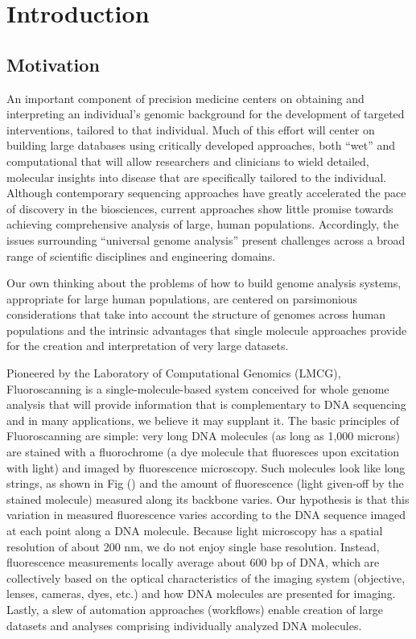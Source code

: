 \section{Introduction}

\subsection{Motivation}
An important component of precision medicine centers on obtaining and interpreting an individual's genomic background for the development of targeted interventions, tailored to that individual. Much of this effort will center on building large databases using critically developed approaches, both ``wet'' and computational that will allow researchers and clinicians to wield detailed, molecular insights into disease that are specifically tailored to the individual. Although contemporary sequencing approaches have greatly accelerated the pace of discovery in the biosciences, current approaches show little promise towards achieving comprehensive analysis of large, human populations. Accordingly, the issues surrounding ``universal genome analysis'' present challenges across a broad range of scientific disciplines and engineering domains.

Our own thinking about the problems of how to build genome analysis systems, appropriate for large human populations, are centered on parsimonious considerations that take into account the structure of genomes across human populations and the intrinsic advantages that single molecule approaches provide for the creation and interpretation of very large datasets.

Pioneered by the Laboratory of Computational Genomics (LMCG), Fluoroscanning is a single-molecule-based system conceived for whole genome analysis that will provide information that is complementary to DNA sequencing and in many applications, we believe it may supplant it. The basic principles of Fluoroscanning are simple: very long DNA molecules (as long as 1,000 microns) are stained with a fluorochrome (a dye molecule that fluoresces upon excitation with light) and imaged by fluorescence microscopy. Such molecules look like long strings, as shown in Fig () and the amount of
fluorescence (light given-off by the stained molecule) measured along its backbone varies. Our hypothesis is that this variation in measured fluorescence varies according to the DNA sequence imaged at each point along a DNA molecule. Because light microscopy has a spatial resolution of about 200 nm, we do not enjoy single base resolution. Instead, fluorescence measurements locally average about 600 bp of DNA, which are collectively based on the optical characteristics of the imaging system (objective, lenses, cameras, dyes, etc.) and how DNA molecules are presented for imaging. Lastly, a slew of automation approaches (workflows) enable creation of large datasets and analyses comprising individually analyzed DNA molecules.

